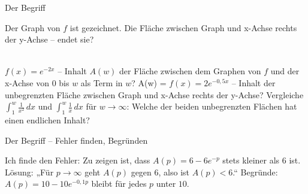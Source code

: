 \setcounter{aufgabe}{5}

\begin{aufgabe}{Der Begriff}
\begin{teile}
\teil Der Graph von $f$ ist gezeichnet. Die Fläche zwischen Graph und x-Achse rechts der y-Achse – endet sie? \\  \\ 

\begin{ksys}[xmin=0,xmax=8,ymin=0,ymax=4]\end{ksys}
\teil $f(x) = e^{-2x}$ – Inhalt $A(w)$ der Fläche zwischen dem Graphen von $f$ und der x-Achse von $0$ bis $w$ als Term in $w$? A(w) = \leerfeld
\teil $f(x) = 2e^{-0{,}5x}$ – Inhalt der unbegrenzten Fläche zwischen Graph und x-Achse rechts der y-Achse?
\teil Vergleiche $∫_1^w \frac{1}{x^2}\,dx$ und $∫_1^w \frac{1}{x}\,dx$ für $w \to \infty$: Welche der beiden unbegrenzten Flächen hat einen endlichen Inhalt?
\end{teile}
\end{aufgabe}

\begin{aufgabe}{Der Begriff – Fehler finden, Begründen}
\begin{teile}
\teil Ich finde den Fehler: Zu zeigen ist, dass $A(p) = 6 - 6e^{-p}$ stets kleiner als $6$ ist. Lösung: „Für $p \to \infty$ geht $A(p)$ gegen $6$, also ist $A(p) < 6$.“
\teil Begründe: $A(p) = 10 - 10e^{-0{,}1p}$ bleibt für jedes $p$ unter $10$.
\end{teile}
\end{aufgabe}
